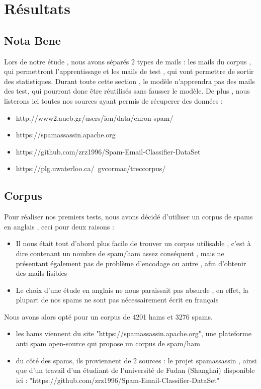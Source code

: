 \documentclass{article}
\begin{document}
\section{Résultats}
\subsection{Nota Bene}
Lors de notre étude , nous avons séparés 2 types de mails : les mails du corpus , qui permettront l'apprentissage et les mails de test , qui vont permettre de sortir des statistiques. Durant toute cette section , le modèle n'apprendra pas des mails des test, qui pourront donc être réutilisés sans fausser le modèle.
De plus , nous listerons ici toutes nos sources ayant permis de récuperer des données :
\begin{itemize}
    \item http://www2.aueb.gr/users/ion/data/enron-spam/
    \item https://spamassassin.apache.org
    \item https://github.com/zrz1996/Spam-Email-Classifier-DataSet
    \item https://plg.uwaterloo.ca/~gvcormac/treccorpus/
\end{itemize}
\subsection{Corpus}
Pour réaliser nos premiers tests, nous avons décidé d'utiliser un corpus de spams en anglais , ceci pour deux raisons : 
\begin{itemize}
    \item Il nous était tout d'abord plus facile de trouver un corpus utilisable , c'est à dire contenant un nombre de spam/ham assez conséquent , mais ne présentant également pas de problème d'encodage ou autre , afin d'obtenir des mails lisibles
    \item Le choix d'une étude en anglais ne nous paraissait pas absurde , en effet, la plupart de nos spams ne sont pas nécessairement écrit en français
\end{itemize}

Nous avons alors opté pour un corpus de 4201 hams et 3276 spams.
\begin{itemize}
    \item les hams viennent du site "https://spamassassin.apache.org", une plateforme anti spam open-source qui propose un corpus de spam/ham
    \item du côté des spams, ils proviennent de 2 sources : le projet spamassassin , ainsi que d'un travail d'un étudiant de l'université de Fudan (Shanghai) disponible ici :  "https://github.com/zrz1996/Spam-Email-Classifier-DataSet"
\end{itemize}
\end{document}
